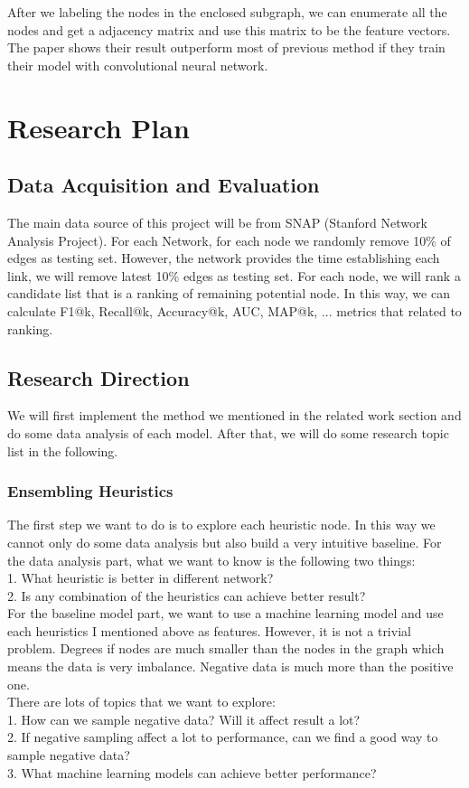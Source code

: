 \documentclass[paper=letter, fontsize=12pt]{scrartcl} %
\begin{document}
After we labeling the nodes in the enclosed subgraph, we can enumerate all the nodes and get a adjacency matrix and use this matrix to be the feature vectors. The paper shows their result outperform most of previous method if they train their model with convolutional neural network.


\section{Research Plan}

\subsection{Data Acquisition and Evaluation}
The main data source of this project will be from SNAP (Stanford Network Analysis Project).
For each Network,  for each node we randomly remove 10\% of edges as testing set. However, the network provides the time establishing each link, we will remove latest 10\% edges as testing set. For each node, we will rank a candidate list that is a ranking of remaining potential node. In this way, we can calculate F1@k, Recall@k, Accuracy@k, AUC, MAP@k, ... metrics that related to ranking. 

\subsection {Research Direction}
We will first implement the method we mentioned in the related work section and do some data analysis of each model. After that, we will do some research topic list in the following. 

\subsubsection {Ensembling Heuristics}
The first step we want to do is to explore each heuristic node. In this way we cannot only do some data analysis but also build a very intuitive baseline. 
For the data analysis part, what we want to know is the following two things: \\
1. What heuristic is better in different network? \\
2. Is any combination of the heuristics can achieve better result? \\

For the baseline model part, we want to use a machine learning model and use each heuristics I mentioned above as features. However, it is not a trivial problem. Degrees if nodes are much smaller than the nodes in the graph which means the data is very imbalance. Negative data is much more than the positive one.\\
There are lots of topics that we want to explore: \\
1. How can we sample negative data? Will it affect result a lot? \\
2. If negative sampling affect a lot to performance, can we find a good way to sample negative data? \\
3. What machine learning models can achieve better performance? \\
\end{document}
